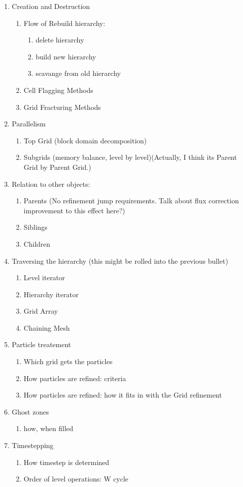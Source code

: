 \begin{enumerate}
 \item Creation and Destruction
   \begin{enumerate}
     \item Flow of Rebuild hierarchy: 
       \begin{enumerate}
	 \item delete hierarchy
	 \item build new hierarchy
	 \item scavange from old hierarchy
       \end{enumerate}
     \item Cell Flagging Methods
     \item Grid Fracturing Methods
   \end{enumerate}    
 \item Parallelism
  \begin{enumerate}
    \item Top Grid (block domain decomposition)
    \item Subgrids (memory balance, level by level)(Actually, I think
          its Parent Grid by Parent Grid.)
  \end{enumerate}
 \item Relation to other objects: 
   \begin{enumerate}
     \item Parents (No refinement jump requirements.  Talk about flux
        correction improvement to this effect here?)
     \item Siblings
     \item Children
     \end{enumerate}
 \item Traversing the hierarchy (this might be rolled into the
   previous bullet)
  \begin{enumerate}
    \item Level iterator 
    \item Hierarchy iterator
    \item Grid Array
    \item Chaining Mesh
  \end{enumerate}
  \item Particle treatement
   \begin{enumerate}
     \item Which grid gets the particles
     \item How particles are refined: criteria
     \item How particles are refined: how it fits in with the Grid refinement
   \end{enumerate}
  \item Ghost zones
    \begin{enumerate}
      \item how, when filled
    \end{enumerate}
  \item Timestepping
    \begin{enumerate}
      \item How timestep is determined
      \item Order of level operations: W cycle
    \end{enumerate}
\end{enumerate}
